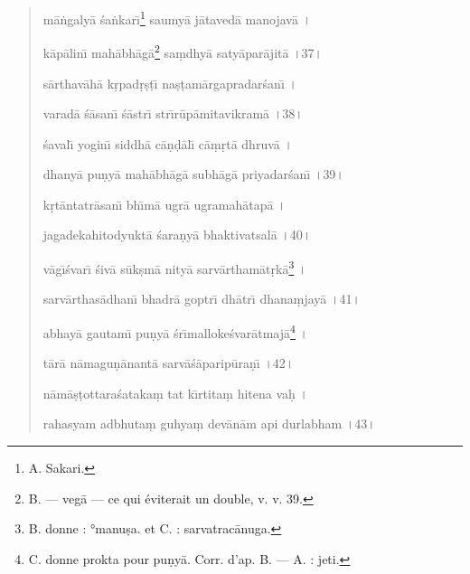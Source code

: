\documentclass[a4paper, 11pt, oneside, french]{article}
\begin{document}
\begin{quotation}
m\={a}\.{n}galy\={a} \'{s}a\.{n}kar\={\i}\footnote{A. Sakari.} saumy\={a} j\={a}taved\={a} manojav\={a} \texthindi{।}

k\={a}p\={a}lin\={\i} mah\={a}bh\={a}g\={a}\footnote{B. --- veg\={a} --- ce qui éviterait un double, v. v. 39.} sa\d{m}dhy\={a} saty\={a}par\={a}jit\={a} \texthindi{।}37\texthindi{।}

\bigskip

s\={a}rthav\={a}h\={a} k\d{r}pad\d{r}\d{s}\d{t}\={\i} na\d{s}\d{t}am\={a}rgapradar\'{s}an\={\i} \texthindi{।}

varad\={a} \'{s}\={a}san\={\i} \'{s}\={a}str\={\i} str\={\i}r\={u}p\={a}mitavikram\={a} \texthindi{।}38\texthindi{।}

\bigskip

\'{s}aval\={\i} yogin\={\i} siddh\={a} c\={a}\d{n}\d{d}\={a}l\={\i} c\={a}\d{m}\d{r}t\={a} dhruv\={a} \texthindi{।}

dhany\={a} pu\d{n}y\={a} mah\={a}bh\={a}g\={a} subh\={a}g\={a} priyadar\'{s}an\={\i} \texthindi{।}39\texthindi{।}

\bigskip

k\d{r}t\={a}ntatr\={a}san\={\i} bh\={\i}m\={a} ugr\={a} ugramah\={a}tap\={a} \texthindi{।}

jagadekahitodyukt\={a} \'{s}ara\d{n}y\={a} bhaktivatsal\={a} \texthindi{।}40\texthindi{।}

\bigskip

v\={a}g\={\i}\'{s}var\={\i} \'{s}iv\={a} s\={u}k\d{s}m\={a} nity\={a} sarv\={a}rtham\={a}t\d{r}k\={a}\footnote{B. donne : °manu\d{s}a. et C. : sarvatrac\={a}nuga.} \texthindi{।}

sarv\={a}rthas\={a}dhan\={\i} bhadr\={a} goptr\={\i} dh\={a}tr\={\i} dhana\d{m}jay\={a} \texthindi{।}41\texthindi{।}

\bigskip

abhay\={a} gautam\={\i} pu\d{n}y\={a} \'{s}r\={\i}malloke\'{s}var\={a}tmaj\={a}\footnote{C. donne prokta pour pu\d{n}y\={a}. Corr. d'ap. B. --- A. : jeti.} \texthindi{।}

t\={a}r\={a} n\={a}magu\d{n}\={a}nant\={a} sarv\={a}\'{s}\={a}parip\={u}ra\d{n}\={\i} \texthindi{।}42\texthindi{।}

\bigskip

n\={a}m\={a}\d{s}\d{t}ottara\'{s}ataka\d{m} tat k\={\i}rtita\d{m} hitena va\d{h} \texthindi{।}

rahasyam adbhuta\d{m} guhya\d{m} dev\={a}n\={a}m api durlabham \texthindi{।}43\texthindi{।}

\bigskip


\end{quotation}
\end{document}
